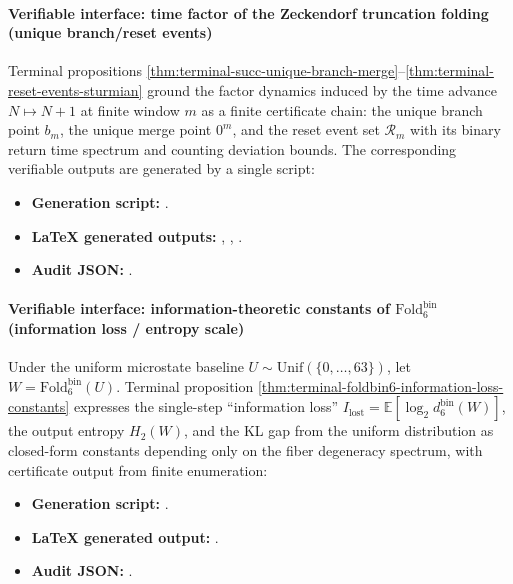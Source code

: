 \paragraph{Verifiable interface: time factor of the Zeckendorf truncation folding (unique branch/reset events)}
Terminal propositions \ref{thm:terminal-succ-unique-branch-merge}--\ref{thm:terminal-reset-events-sturmian} ground the factor dynamics induced by the time advance \(N\mapsto N+1\) at finite window \(m\) as a finite certificate chain: the unique branch point \(b_m\), the unique merge point \(0^m\), and the reset event set \(\mathcal R_m\) with its binary return time spectrum and counting deviation bounds.
The corresponding verifiable outputs are generated by a single script:
\begin{itemize}
  \item \textbf{Generation script:} \texttt{}.
  \item \textbf{LaTeX generated outputs:} \texttt{},
  \texttt{},
  \texttt{}.
  \item \textbf{Audit JSON:} \texttt{}.
\end{itemize}

\paragraph{Verifiable interface: information-theoretic constants of \texorpdfstring{$\mathrm{Fold}^{\mathrm{bin}}_6$}{Foldbin6} (information loss / entropy scale)}
Under the uniform microstate baseline \(U\sim\mathrm{Unif}(\{0,\dots,63\})\), let \(W=\mathrm{Fold}^{\mathrm{bin}}_6(U)\).
Terminal proposition \ref{thm:terminal-foldbin6-information-loss-constants} expresses the single-step ``information loss'' \(I_{\mathrm{lost}}=\mathbb{E}[\log_2 d^{\mathrm{bin}}_6(W)]\), the output entropy \(H_2(W)\), and the KL gap from the uniform distribution as closed-form constants depending only on the fiber degeneracy spectrum, with certificate output from finite enumeration:
\begin{itemize}
  \item \textbf{Generation script:} \texttt{}.
  \item \textbf{LaTeX generated output:} \texttt{}.
  \item \textbf{Audit JSON:} \texttt{}.
\end{itemize}

